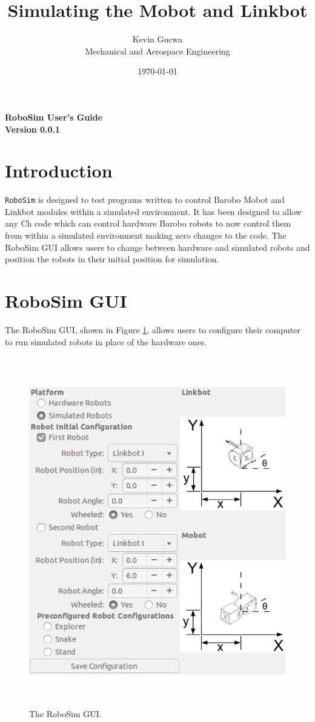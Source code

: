 \documentclass{article}
\title{Simulating the Mobot and Linkbot}
\author{Kevin Gucwa\\Mechanical and Aerospace Engineering}
\date{\today}
\begin{document}
\begin{center}
{\Huge\sf\bf RoboSim User's Guide}\\
\vspace*{2.5cm}
{\Large\bf Version 0.0.1}
\vspace{4.5cm}
\end{center}

\newpage
\tableofcontents
\newpage

\section{Introduction}
\texttt{RoboSim} is designed to test programs written to control Barobo Mobot
and Linkbot modules within a simulated environment.  It has been designed to
allow any Ch code which can control hardware Barobo robots to now control them
from within a simulated environment making zero changes to the code.  The
RoboSim GUI allows users to change between hardware and simulated robots and
position the robots in their initial position for simulation.

\section{RoboSim GUI}
\label{sec:gui}
The RoboSim GUI, shown in Figure \ref{fig:gui}, allows users to configure their
computer to run simulated robots in place of the hardware ones.

\begin{figure}[H]
	\begin{center}
		\includegraphics[height=6in]{images/gui}
	\end{center}
	\caption{The RoboSim GUI.}
	\label{fig:gui}
\end{figure}
\end{document}
